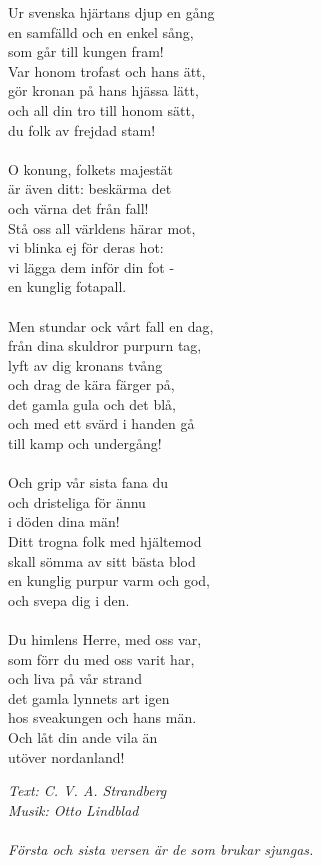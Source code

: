 \vspace{10pt}
Ur svenska hjärtans djup en gång\\
en samfälld och en enkel sång,\\
som går till kungen fram!\\
Var honom trofast och hans ätt,\\
gör kronan på hans hjässa lätt,\\
och all din tro till honom sätt,\\
du folk av frejdad stam!\\
\\
O konung, folkets majestät\\
är även ditt: beskärma det\\
och värna det från fall!\\
Stå oss all världens härar mot,\\
vi blinka ej för deras hot:\\
vi lägga dem inför din fot -\\
en kunglig fotapall.\\
\\
Men stundar ock vårt fall en dag,\\
från dina skuldror purpurn tag,\\
lyft av dig kronans tvång\\
och drag de kära färger på,\\
det gamla gula och det blå,\\
och med ett svärd i handen gå\\
till kamp och undergång!\\
\\
Och grip vår sista fana du\\
och dristeliga för ännu\\
i döden dina män!\\
Ditt trogna folk med hjältemod\\
skall sömma av sitt bästa blod\\
en kunglig purpur varm och god,\\
och svepa dig i den.\\
\\
Du himlens Herre, med oss var,\\
som förr du med oss varit har,\\
och liva på vår strand\\
det gamla lynnets art igen\\
hos sveakungen och hans män.\\
Och låt din ande vila än\\
utöver nordanland!
\par
\vspace{10pt}
{\footnotesize\textit{Text: C. V. A. Strandberg\\
Musik: Otto Lindblad\\
\\
Första och sista versen är de som brukar sjungas.}}
